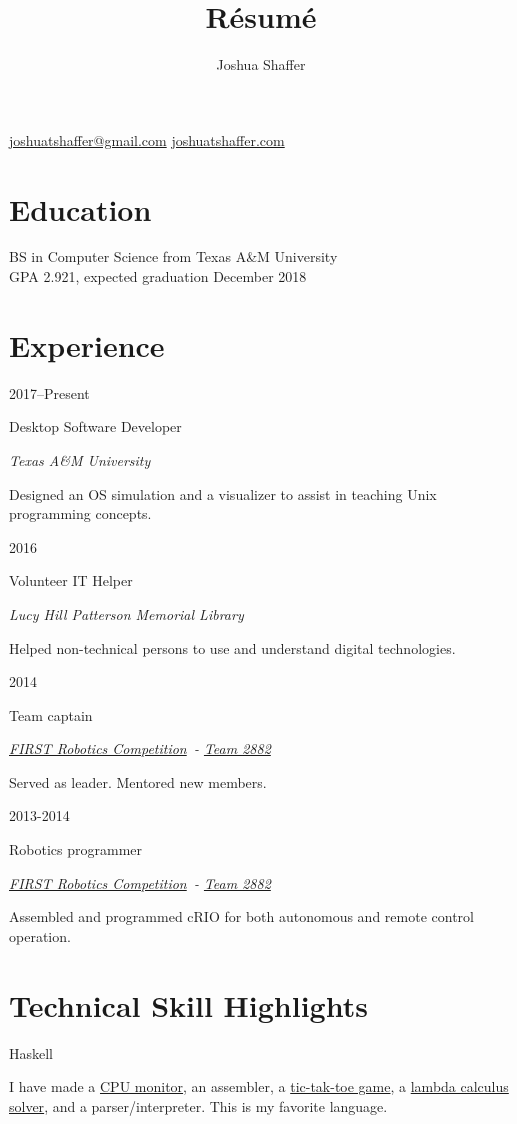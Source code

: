\documentclass{article}
\title{R\'esum\'e}
\author{Joshua Shaffer}
\newcommand{\jskill}[2]{
\noindent
\begin{minipage}[t]{.15\textwidth}
\hfill #1
\end{minipage}
\hspace{.05em}\vline\hspace{.05em}
\begin{minipage}[t]{.80\textwidth}
#2
\end{minipage}

\vspace{0.75em}}
\newcommand{\entry}[4]{
\jskill{#1}{#2

\textit{#3}

\footnotesize{#4}}
}
\newcommand{\frc}{\href{https://www.firstinspires.org/robotics/frc}{FIRST Robotics Competition}}
\newcommand{\frct}{\href{https://www.thebluealliance.com/team/2882}{Team 2882}}
\begin{document}
\begin{center}
 \begin{minipage}{2in}%
  \begin{center}
   \mbox{\huge\bfseries\theauthor}
   \mbox{\href{mailto:joshuatshaffer@gmail.com}{joshuatshaffer@gmail.com}}
   \mbox{\href{http://joshuatshaffer.com}{joshuatshaffer.com}}
  \end{center}
 \end{minipage}
 \hfill
\end{center}

\section{Education}

\noindent
BS in Computer Science from Texas A\&M University \\
GPA 2.921, expected graduation December 2018

\section{Experience}

\entry
{2017--Present}
{Desktop Software Developer}
{Texas A\&M University}
{Designed an OS simulation and a visualizer to assist in teaching Unix programming concepts.}

\entry
{2016}
{Volunteer IT Helper}
{Lucy Hill Patterson Memorial Library}
{Helped non-technical persons to use and understand digital technologies.}

\entry
{2014}
{Team captain}
{\frc\ - \frct}
{Served as leader. Mentored new members.}

\entry
{2013-2014}
{Robotics programmer}
{\frc\ - \frct}
{Assembled and programmed cRIO for both autonomous and remote control operation.}

\section{Technical Skill Highlights}

\jskill{Haskell}{I have made a \href{https://github.com/joshuatshaffer/retro-cpu-monitor/tree/master/host-haskell}{CPU monitor}, an assembler, a \href{https://github.com/joshuatshaffer/tic-tac-lambda}{tic-tak-toe game}, a \href{https://github.com/joshuatshaffer/de-bruijn-index}{lambda calculus solver}, and a parser/interpreter. This is my favorite language.}
\end{document}
